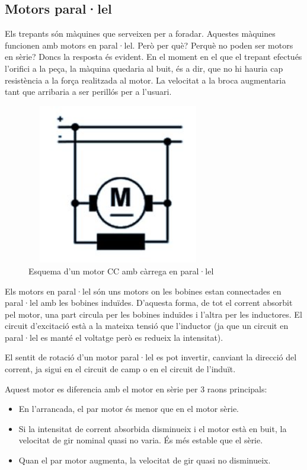 \subsection{Motors paral·lel}

Els trepants són màquines que serveixen per a foradar. Aquestes màquines funcionen amb motors en paral·lel. Però per què? Perquè no poden ser motors en sèrie? Doncs la resposta és evident. En el moment en el que el trepant efectués l'orifici a la peça, la màquina quedaria al buit, és a dir, que no hi hauria cap resistència a la força realitzada al motor. La velocitat a la broca augmentaria tant que arribaria a ser perillós per a l'usuari.

\begin{figure}[H]
		\centering
    	\includegraphics[width=8cm, height=7cm]{Motors/Motor_paralelo.jpg}
     	\caption{Esquema d'un motor CC amb càrrega en paral·lel} 
\end{figure}

Els motors en paral·lel són uns motors on les bobines estan connectades en paral·lel amb les bobines induïdes. D'aquesta forma, de tot el corrent absorbit pel motor, una part circula per les bobines induïdes i l'altra per les inductores. El circuit d'excitació està a la mateixa tensió que l'inductor (ja que un circuit en paral·lel es manté el voltatge però es redueix la intensitat).

El sentit de rotació d'un motor paral·lel es pot invertir, canviant la direcció del corrent, ja sigui en el circuit de camp o en el circuit de l'induït.

Aquest motor es diferencia amb el motor en sèrie per 3 raons principals:
\begin{itemize}
    \item En l'arrancada, el par motor és menor que en el motor sèrie.
    \item Si la intensitat de corrent absorbida disminueix i el motor està en buit, la velocitat de gir nominal quasi no varia. És més estable que el sèrie.
    \item Quan el par motor augmenta, la velocitat de gir quasi no disminueix.
\end{itemize}

